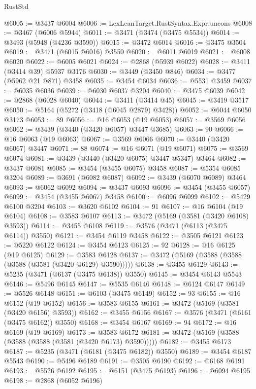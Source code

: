 \begin{lexlean}{RustStd}
\begin{coremodule}
{{{{{{{{{{{{{{{{{{{@6005 := @3437 @6004
@6006 := LexLeanTarget.RustSyntax.Expr.uncons
@6008 := @3467 (@6006 @5944)
@6011 := @3471 (@3474 (@3475 @5534))
@6014 := @3493 (@5948 (@4236 @3590))
@6015 := @3472 @6014
@6016 := @3475 @3504
@6019 := @3471 (@6015 @6016) @3550
@6020 := @6011 @6019
@6021 := @6008 @6020
@6022 := @6005 @6021
@6024 := @2868 (@5939 @6022)
@6028 := @3411 (@3414 @39) @5937 @3176
@6030 := @3449 (@3450 @846)
@6034 := @3477 (@5962 @21 @871) @3458
@6035 := @3454 @6034
@6036 := @5531 @3459
@6037 := @6035 @6036
@6039 := @6030 @6037 @3204
@6040 := @3475 @6039
@6042 := @2868 (@6028 @6040)
@6044 := @3411 (@3414 @45)
@6045 := @3419 @3517
@6050 := @5164 (@5272 (@3418 (@6045 @2879) @3428))
@6052 := @6044 @6050 @3173
@6053 := 89
@6056 := @16 @6053 (@19 @6053)
@6057 := @3569 @6056
@6062 := @3439 (@3440 (@3420 @6057) @3447 @3685)
@6063 := 90
@6066 := @16 @6063 (@19 @6063)
@6067 := @3569 @6066
@6070 := @3440 (@3420 @6067) @3447
@6071 := 88
@6074 := @16 @6071 (@19 @6071)
@6075 := @3569 @6074
@6081 := @3439 (@3440 (@3420 @6075) @3447 @5347) @3464
@6082 := @3437 @6081
@6085 := @3454 (@3455 @6075) @3458
@6087 := @5354 @6085 @3204
@6089 := @3691 (@6082 @6087)
@6092 := @3439 (@6070 @6089) @3464
@6093 := @6062 @6092
@6094 := @3437 @6093
@6096 := @3454 (@3455 @6057)
@6099 := @3454 (@3455 @6067) @3458
@6100 := @6096 @6099
@6102 := @5429 @6100 @3204
@6103 := @3620 @6102
@6104 := 91
@6107 := @16 @6104 (@19 @6104)
@6108 := @3583 @6107
@6113 := @3472 (@5169 (@3581 (@3420 @6108) @3593))
@6114 := @3455 @6108
@6119 := @3576 (@3471 (@6113 (@3475 @6114)) @3550)
@6121 := @3454 @6119 @3458
@6122 := @3505 @6121
@6123 := @5220 @6122
@6124 := @3454 @6123
@6125 := 92
@6128 := @16 @6125 (@19 @6125)
@6129 := @3583 @6128
@6137 := @3472 (@5169 (@3588 (@3588 (@3588 (@3581 (@3420 @6129) @3590)))))
@6138 := @3455 @6129
@6143 := @5235 (@3471 (@6137 (@3475 @6138)) @3550)
@6145 := @3454 @6143 @5543
@6146 := @5496 @6145
@6147 := @5535 @6146
@6148 := @6124 @6147
@6149 := @5526 @6148
@6151 := @6103 (@3475 @6149)
@6152 := 93
@6155 := @16 @6152 (@19 @6152)
@6156 := @3583 @6155
@6161 := @3472 (@5169 (@3581 (@3420 @6156) @3593))
@6162 := @3455 @6156
@6167 := @3576 (@3471 (@6161 (@3475 @6162)) @3550)
@6168 := @3454 @6167
@6169 := 94
@6172 := @16 @6169 (@19 @6169)
@6173 := @3583 @6172
@6181 := @3472 (@5169 (@3588 (@3588 (@3588 (@3581 (@3420 @6173) @3590)))))
@6182 := @3455 @6173
@6187 := @5235 (@3471 (@6181 (@3475 @6182)) @3550)
@6189 := @3454 @6187 @5543
@6190 := @5496 @6189
@6191 := @3505 @6190
@6192 := @6168 @6191
@6193 := @5526 @6192
@6195 := @6151 (@3475 @6193)
@6196 := @6094 @6195
@6198 := @2868 (@6052 @6196)
}}}}}}}}}}}}}}}}}}}
\end{coremodule}
\end{lexlean}
